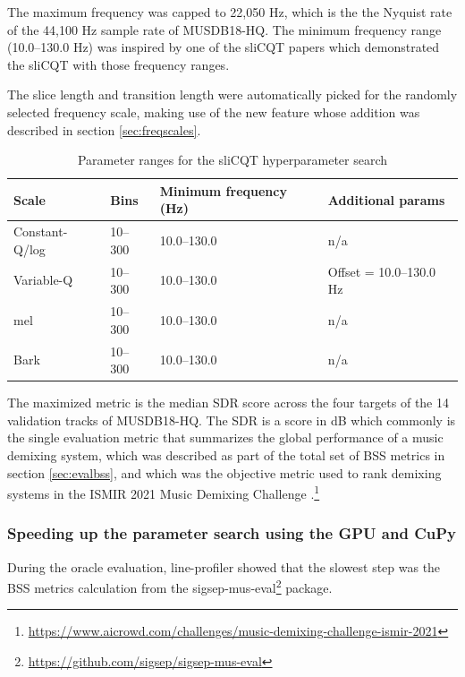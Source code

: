 \documentclass[report.tex]{subfiles}
\begin{document}
The maximum frequency was capped to 22,050 Hz, which is the the Nyquist rate of the 44,100 Hz sample rate of MUSDB18-HQ. The minimum frequency range (10.0--130.0 Hz) was inspired by one of the sliCQT papers \parencite{slicq} which demonstrated the sliCQT with those frequency ranges.

The slice length and transition length were automatically picked for the randomly selected frequency scale, making use of the new feature whose addition was described in section \ref{sec:freqscales}.

\begin{table}[ht]
	\centering
	\caption{Parameter ranges for the sliCQT hyperparameter search}
	\label{table:slicqparams}
\begin{tabular}{ |l|l|l|l| }
	 \hline
	 Scale & Bins & Minimum frequency (Hz) & Additional params \\
	 \hline
	 \hline
	 Constant-Q/log & 10--300 & 10.0--130.0 & n/a \\
	 \hline
	 Variable-Q & 10--300 & 10.0--130.0 & Offset = 10.0--130.0 Hz \\
	 \hline
	 \hline
	 mel & 10--300 & 10.0--130.0 & n/a \\
	 \hline
	 Bark & 10--300 & 10.0--130.0 & n/a \\
	 \hline
\end{tabular}
\end{table}

The maximized metric is the median SDR score across the four targets of the 14 validation tracks of MUSDB18-HQ. The SDR is a score in dB which commonly is the single evaluation metric that summarizes the global performance of a music demixing system, which was described as part of the total set of BSS metrics in section \ref{sec:evalbss}, and which was the objective metric used to rank demixing systems in the ISMIR 2021 Music Demixing Challenge \parencite{mdx21}.\footnote{\url{https://www.aicrowd.com/challenges/music-demixing-challenge-ismir-2021}}

\subsubsection{Speeding up the parameter search using the GPU and CuPy}
\label{sec:fasterbsscupy}

During the oracle evaluation, line-profiler showed that the slowest step was the BSS metrics calculation from the sigsep-mus-eval\footnote{\url{https://github.com/sigsep/sigsep-mus-eval}} package.
\end{document}
